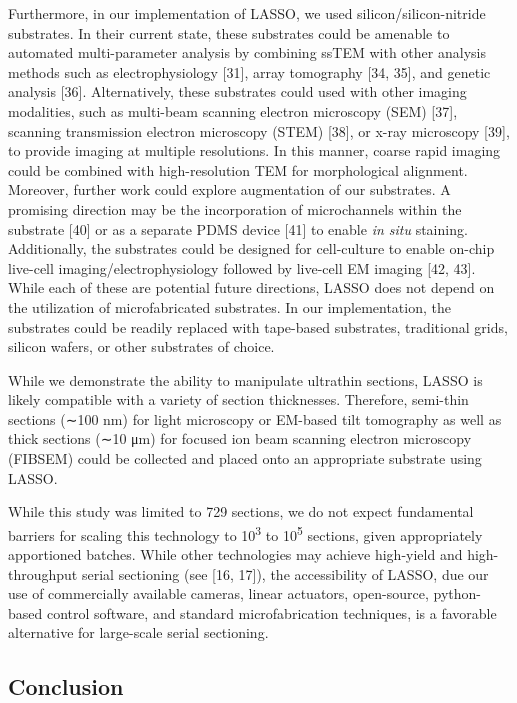 \documentclass{article}
\begin{document}
Furthermore, in our implementation of LASSO, we used silicon/silicon-nitride substrates. In their current state, these substrates could be amenable to automated multi-parameter analysis by combining ssTEM with other analysis methods such as electrophysiology [31], array tomography [34, 35], and genetic analysis [36]. Alternatively, these substrates could used with other imaging modalities, such as multi-beam scanning electron microscopy (SEM) [37], scanning transmission electron microscopy (STEM) [38], or x-ray microscopy [39], to provide imaging at multiple resolutions. In this manner, coarse rapid imaging could be combined with high-resolution TEM for morphological alignment. Moreover, further work could explore augmentation of our substrates. A promising direction may be the incorporation of microchannels within the substrate [40] or as a separate PDMS device [41] to enable \emph{in situ} staining. Additionally, the substrates could be designed for cell-culture to enable on-chip live-cell imaging/electrophysiology followed by live-cell EM imaging [42, 43]. While each of these are potential future directions, LASSO does not depend on the utilization of microfabricated substrates. In our implementation, the substrates could be readily replaced with tape-based substrates, traditional grids, silicon wafers, or other substrates of choice.

While we demonstrate the ability to manipulate ultrathin sections, LASSO is likely compatible with a variety of section thicknesses. Therefore, semi-thin sections (∼100 nm) for light microscopy or EM-based tilt tomography as well as thick sections (∼10 μm) for focused ion beam scanning electron microscopy (FIBSEM) could be collected and placed onto an appropriate substrate using LASSO.

While this study was limited to 729 sections, we do not expect fundamental barriers for scaling this technology to 10\textsuperscript{3} to 10\textsuperscript{5} sections, given appropriately apportioned batches. While other technologies may achieve high-yield and high-throughput serial sectioning (see [16, 17]), the accessibility of LASSO, due our use of commercially available cameras, linear actuators, open-source, python-based control software, and standard microfabrication techniques, is a favorable alternative for large-scale serial sectioning.

\subsection*{Conclusion}
\end{document}
